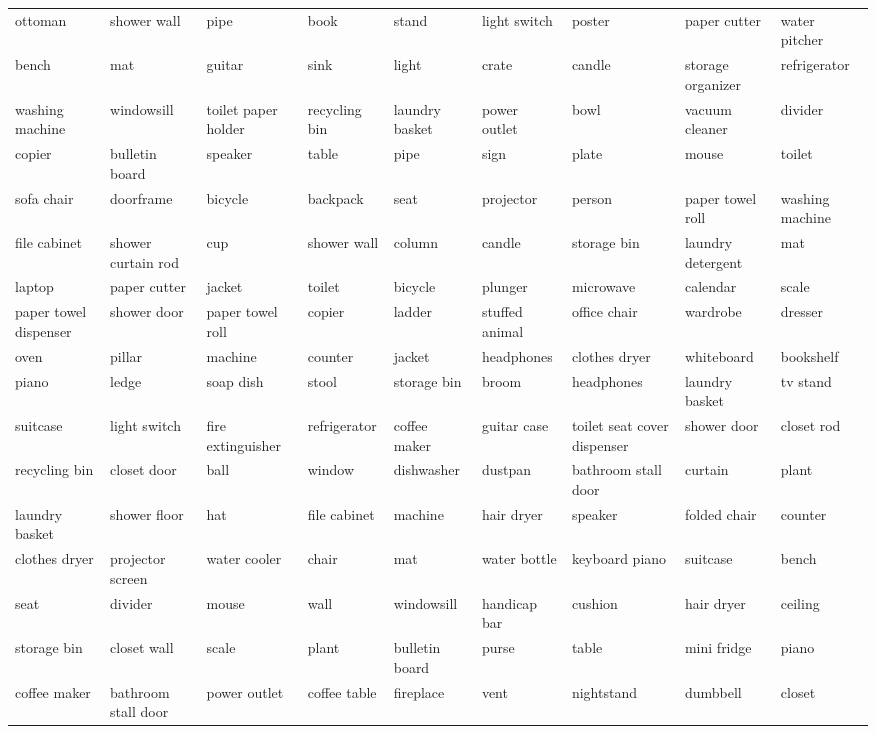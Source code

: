 \begin{table*}[!ht]
{\begin{tabular}{lll|lll|lll}
        ottoman & shower wall & pipe & book & stand & light switch & poster & paper cutter & water pitcher \\ 
        bench & mat & guitar & sink & light & crate & candle & storage organizer & refrigerator \\ 
        washing machine & windowsill & toilet paper holder & recycling bin & laundry basket & power outlet & bowl & vacuum cleaner & divider \\ 
        copier & bulletin board & speaker & table & pipe & sign & plate & mouse & toilet \\ 
        sofa chair & doorframe & bicycle & backpack & seat & projector & person & paper towel roll & washing machine \\ 
        file cabinet & shower curtain rod & cup & shower wall & column & candle & storage bin & laundry detergent & mat \\ 
        laptop & paper cutter & jacket & toilet & bicycle & plunger & microwave & calendar & scale \\ 
        paper towel dispenser & shower door & paper towel roll & copier & ladder & stuffed animal & office chair & wardrobe & dresser \\ 
        oven & pillar & machine & counter & jacket & headphones & clothes dryer & whiteboard & bookshelf \\ 
        piano & ledge & soap dish & stool & storage bin & broom & headphones & laundry basket & tv stand \\ 
        suitcase & light switch & fire extinguisher & refrigerator & coffee maker & guitar case & toilet seat cover dispenser & shower door & closet rod \\ 
        recycling bin & closet door & ball & window & dishwasher & dustpan & bathroom stall door & curtain & plant \\ 
        laundry basket & shower floor & hat & file cabinet & machine & hair dryer & speaker & folded chair & counter \\ 
        clothes dryer & projector screen & water cooler & chair & mat & water bottle & keyboard piano & suitcase & bench \\ 
        seat & divider & mouse & wall & windowsill & handicap bar & cushion & hair dryer & ceiling \\ 
        storage bin & closet wall & scale & plant & bulletin board & purse & table & mini fridge & piano \\ 
        coffee maker & bathroom stall door & power outlet & coffee table & fireplace & vent & nightstand & dumbbell & closet \\ 

\end{tabular}}
\end{table*}
